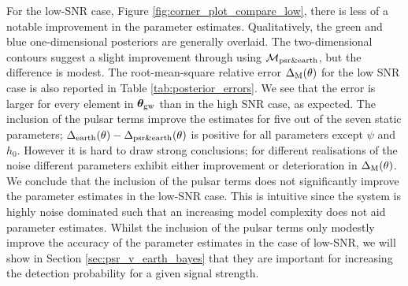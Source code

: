\documentclass[fleqn,usenatbib,useAMS]{mnras}
\begin{document}
For the low-SNR case,  Figure \ref{fig:corner_plot_compare_low}, there is less of a notable improvement in the parameter estimates. Qualitatively, the green and blue one-dimensional posteriors are generally overlaid. The two-dimensional contours suggest a slight improvement through using $\mathcal{M}_{\rm psr \& earth}$, but the difference is modest. The root-mean-square relative error $\Delta_{\rm M}(\theta)$ for the low SNR case is also reported in Table \ref{tab:posterior_errors}. We see that the error is larger for every element in $\boldsymbol{\theta}_{\rm gw}$ than in the high SNR case, as expected. The inclusion of the pulsar terms improve the estimates for five out of the seven static parameters; $\Delta_{\rm earth}(\theta)-\Delta_{\rm psr \& earth}(\theta)$ is positive for all parameters except $\psi$ and $h_0$. However it is hard to draw strong conclusions; for different realisations of the noise different parameters exhibit either improvement or deterioration in $\Delta_{\rm M}(\theta)$. We conclude that the inclusion of the pulsar terms does not significantly improve the parameter estimates in the low-SNR case. This is intuitive since the system is highly noise dominated such that an increasing model complexity does not aid parameter estimates. Whilst the inclusion of the pulsar terms only modestly improve the accuracy of the parameter estimates in the case of low-SNR, we will show in Section \ref{sec:psr_v_earth_bayes} that they are important for increasing the detection probability for a given signal strength. \newline 
		
\end{document}
